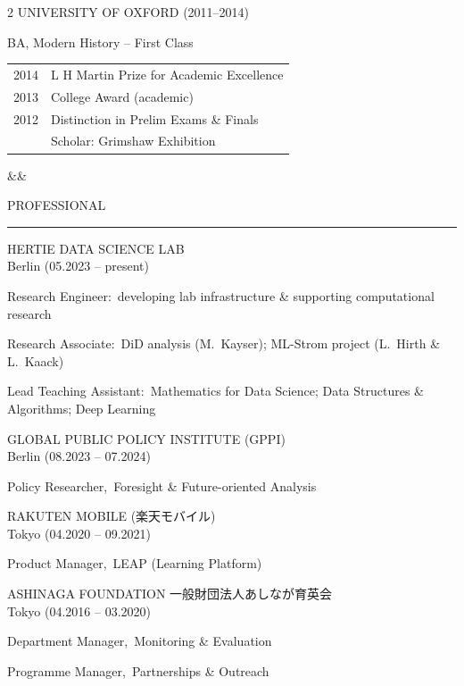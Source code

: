 \documentclass[a4paper,10pt]{article}
\newcommand{\jp}[1]{{\japanesefont #1}}
\newcommand{\cvsection}[1]{%
    \vspace{1.2em}%
    {\montserratbold\fontsize{15}{17}\selectfont\MakeUppercase{#1}}\\[-0.2em]%
    {\color{rule}\rule{2cm}{2pt}}%
    \vspace{0.6em}\par%
}
\newcommand{\educationentry}[4]{%
    {\montserratsemibold\fontsize{10}{12}\selectfont\MakeUppercase{#1 (#2)}}\\[0.2em]%
    #3%
    \ifx&#4&\else\vspace{0.2em}\\#4\fi%
    \vspace{0.8em}\par%
}
\newcommand{\cventry}[3]{%
    {\montserratsemibold\fontsize{10}{12}\selectfont\MakeUppercase{#1}}\\[0.1em]%
    {\color{medgrey}\fontsize{9}{11}\selectfont #2 (#3)}%
    \vspace{0.4em}\par%
}
\newcommand{\cvrole}[2]{%
    {\montserratsemibold #1}\ {#2}%
}
\newcommand{\maintext}[1]{%
    {\fontsize{9.5}{13}\selectfont #1}%
}
\begin{document}
\begin{paracol}{2}
\educationentry{University of Oxford}{2011--2014}{%
\maintext{%
BA, Modern History -- First Class\\[0.2em]
\begin{tabular}{@{}r@{\hspace{0.6em}}l@{}}
2014 & L H Martin Prize for Academic Excellence\\
2013 & College Award (academic)\\
2012 & Distinction in Prelim Exams \& Finals\\
     & {\color{darkgrey}Scholar: Grimshaw Exhibition}
\end{tabular}%
}}{}

\cvsection{Professional}

\cventry{Hertie Data Science Lab}{Berlin}{05.2023 -- present}

\maintext{%
\cvrole{Research Engineer:}{developing lab infrastructure \& supporting computational research}\par\vspace{0.25em}
\cvrole{Research Associate:}{DiD analysis (M.\ Kayser); ML-Strom project (L.\ Hirth \& L.\ Kaack)}\par\vspace{0.25em}
\cvrole{Lead Teaching Assistant:}{Mathematics for Data Science; Data Structures \& Algorithms; Deep Learning}%
}

\vspace{0.9em}

\cventry{Global Public Policy Institute (GPPi)}{Berlin}{08.2023 -- 07.2024}

\maintext{%
\cvrole{Policy Researcher,}{Foresight \& Future-oriented Analysis}%
}

\vspace{0.9em}

\cventry{Rakuten Mobile \jp{(楽天モバイル)}}{Tokyo}{04.2020 -- 09.2021}

\maintext{%
\cvrole{Product Manager,}{LEAP (Learning Platform)}%
}

\vspace{0.9em}

\cventry{Ashinaga Foundation \jp{一般財団法人あしなが育英会}}{Tokyo}{04.2016 -- 03.2020}

\maintext{%
\cvrole{Department Manager,}{Monitoring \& Evaluation}\par\vspace{0.25em}
\cvrole{Programme Manager,}{Partnerships \& Outreach}%
}

\end{paracol}
\end{document}

